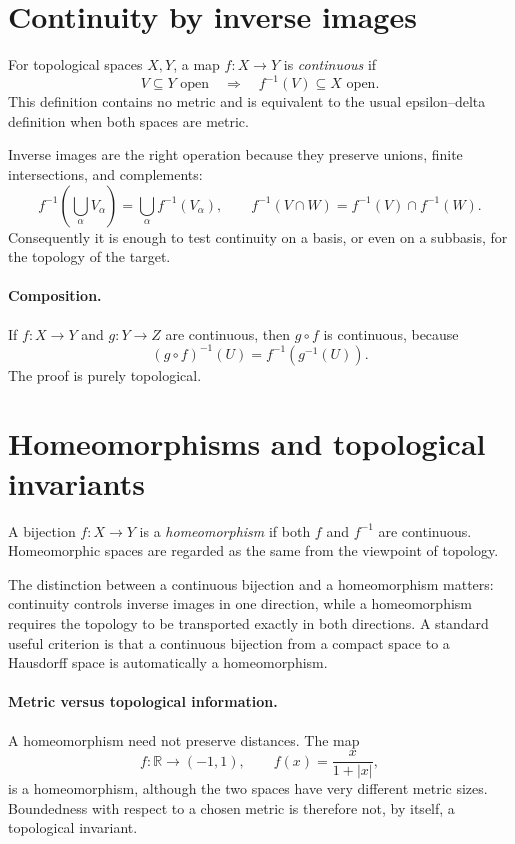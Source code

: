 \section{Continuity by inverse images}
For topological spaces \(X,Y\), a map \(f:X\to Y\) is \emph{continuous} if
\[
V\subseteq Y\text{ open}\quad\Longrightarrow\quad f^{-1}(V)\subseteq X\text{ open}.
\]
This definition contains no metric and is equivalent to the usual epsilon--delta definition when both spaces are metric.

Inverse images are the right operation because they preserve unions, finite intersections, and complements:
\[
f^{-1}\!\left(\bigcup_\alpha V_\alpha\right)=\bigcup_\alpha f^{-1}(V_\alpha),
\qquad
f^{-1}(V\cap W)=f^{-1}(V)\cap f^{-1}(W).
\]
Consequently it is enough to test continuity on a basis, or even on a subbasis, for the topology of the target.

\paragraph{Composition.}
If \(f:X\to Y\) and \(g:Y\to Z\) are continuous, then \(g\circ f\) is continuous, because
\[
(g\circ f)^{-1}(U)=f^{-1}(g^{-1}(U)).
\]
The proof is purely topological.

\section{Homeomorphisms and topological invariants}
A bijection \(f:X\to Y\) is a \emph{homeomorphism} if both \(f\) and \(f^{-1}\) are continuous. Homeomorphic spaces are regarded as the same from the viewpoint of topology.

The distinction between a continuous bijection and a homeomorphism matters: continuity controls inverse images in one direction, while a homeomorphism requires the topology to be transported exactly in both directions. A standard useful criterion is that a continuous bijection from a compact space to a Hausdorff space is automatically a homeomorphism.

\paragraph{Metric versus topological information.}
A homeomorphism need not preserve distances. The map
\[
f:\mathbb R\to(-1,1),\qquad f(x)=\frac{x}{1+|x|},
\]
is a homeomorphism, although the two spaces have very different metric sizes. Boundedness with respect to a chosen metric is therefore not, by itself, a topological invariant.

